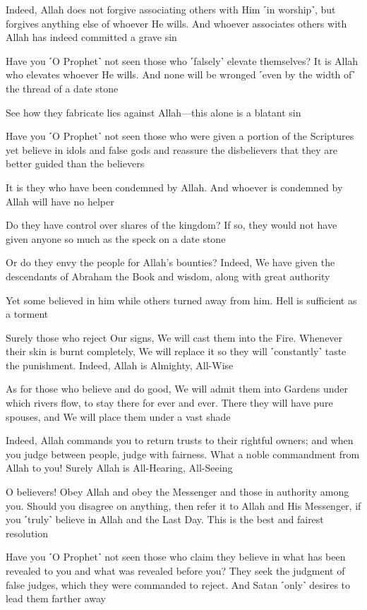 Indeed, Allah does not forgive associating others with Him ˹in worship˺, but forgives anything else of whoever He wills. And whoever associates others with Allah has indeed committed a grave sin

Have you ˹O Prophet˺ not seen those who ˹falsely˺ elevate themselves? It is Allah who elevates whoever He wills. And none will be wronged ˹even by the width of˺ the thread of a date stone

See how they fabricate lies against Allah—this alone is a blatant sin

Have you ˹O Prophet˺ not seen those who were given a portion of the Scriptures yet believe in idols and false gods and reassure the disbelievers that they are better guided than the believers

It is they who have been condemned by Allah. And whoever is condemned by Allah will have no helper

Do they have control over shares of the kingdom? If so, they would not have given anyone so much as the speck on a date stone

Or do they envy the people for Allah’s bounties? Indeed, We have given the descendants of Abraham the Book and wisdom, along with great authority

Yet some believed in him while others turned away from him. Hell is sufficient as a torment

Surely those who reject Our signs, We will cast them into the Fire. Whenever their skin is burnt completely, We will replace it so they will ˹constantly˺ taste the punishment. Indeed, Allah is Almighty, All-Wise

As for those who believe and do good, We will admit them into Gardens under which rivers flow, to stay there for ever and ever. There they will have pure spouses, and We will place them under a vast shade

Indeed, Allah commands you to return trusts to their rightful owners; and when you judge between people, judge with fairness. What a noble commandment from Allah to you! Surely Allah is All-Hearing, All-Seeing

O believers! Obey Allah and obey the Messenger and those in authority among you. Should you disagree on anything, then refer it to Allah and His Messenger, if you ˹truly˺ believe in Allah and the Last Day. This is the best and fairest resolution

Have you ˹O Prophet˺ not seen those who claim they believe in what has been revealed to you and what was revealed before you? They seek the judgment of false judges, which they were commanded to reject. And Satan ˹only˺ desires to lead them farther away


